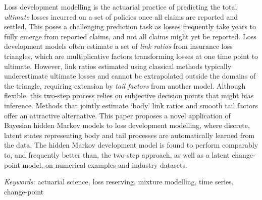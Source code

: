 Loss development modelling is the actuarial practice of predicting the 
total \textit{ultimate} losses incurred on a set of policies once all 
claims are reported and settled. This poses a challenging prediction 
task as losses frequently take years to fully emerge from 
reported claims, and not all claims might yet be reported.
Loss development models often estimate a set of 
\textit{link ratios} from insurance loss triangles, which are multiplicative 
factors transforming losses at one time point to ultimate. However, 
link ratios estimated using classical methods typically underestimate 
ultimate losses and cannot be extrapolated outside the domains of the 
triangle, requiring extension by \textit{tail factors} from another model. 
Although flexible, this two-step process relies on
subjective decision points that might bias inference.
Methods that jointly estimate `body’ link ratios and 
smooth tail factors offer an attractive 
alternative. This paper proposes a novel application of Bayesian 
hidden Markov models to loss development modelling, where discrete, 
latent states representing body and tail processes are automatically 
learned from the data. The hidden Markov development model 
is found to perform comparably to, and frequently better than, the 
two-step approach, as well as a latent change-point model,
on numerical examples and industry datasets.

\textit{Keywords}: actuarial science, loss reserving, mixture modelling, time series, change-point
